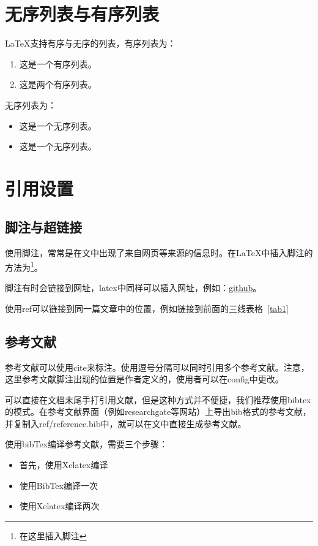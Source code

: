 \section{无序列表与有序列表}

\LaTeX 支持有序与无序的列表，有序列表为：
\begin{enumerate}
\item{这是一个有序列表。}
\item{这是两个有序列表。}
\end{enumerate}

无序列表为：
\begin{itemize}
\item{这是一个无序列表。}
\item{这是一个无序列表。}
\end{itemize}

\section{引用设置}

\subsection{脚注与超链接}

使用脚注，常常是在文中出现了来自网页等来源的信息时。在\LaTeX 中插入脚注的方法为\footnote{在这里插入脚注}。

脚注有时会链接到网址，latex中同样可以插入网址，例如：\href{https://github.com}{github}。

使用ref可以链接到同一篇文章中的位置，例如链接到前面的三线表格~\ref{tab1}

\subsection{参考文献}

参考文献可以使用cite来标注。使用逗号分隔可以同时引用多个参考文献。注意，这里参考文献脚注出现的位置是作者定义的，使用者可以在config中更改。

可以直接在文档末尾手打引用文献，但是这种方式并不便捷，我们推荐使用bibtex的模式。在参考文献界面（例如researchgate等网站）上导出bib格式的参考文献，并复制入ref/reference.bib中，就可以在文中直接生成参考文献\cite{article1}。

使用bibTex编译参考文献，需要三个步骤： 
\begin{itemize}
\item{首先，使用Xelatex编译}
\item{使用BibTex编译一次}
\item{使用Xelatex编译两次}
\end{itemize}

